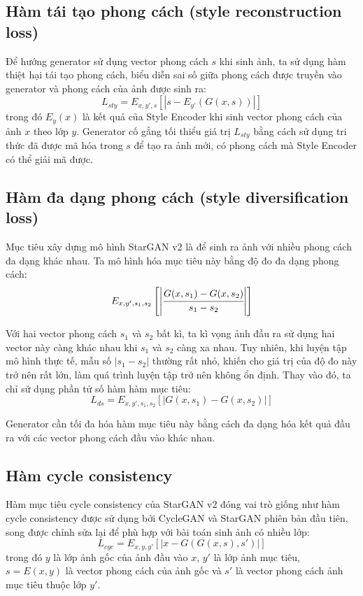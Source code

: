 \documentclass[12pt]{extreport}
\begin{document}
\subsection{Hàm tái tạo phong cách (style reconstruction loss)}

Để hướng generator sử dụng vector phong cách $ s $ khi sinh ảnh, ta sử dụng hàm thiệt hại tái tạo phong cách, biểu diễn sai số giữa phong cách được truyền vào generator và phong cách của ảnh được sinh ra:
$$ L_{sty} = E_{x,y',s} [|s - E_{y'}(G(x, s))|] $$
trong đó $ E_{y}(x) $ là kết quả của Style Encoder khi sinh vector phong cách của ảnh $ x $ theo lớp $ y $. Generator cố gắng tối thiểu giá trị $ L_{sty} $ bằng cách sử dụng tri thức đã được mã hóa trong $ s $ để tạo ra ảnh mới, có phong cách mà Style Encoder có thể giải mã được.

\subsection{Hàm đa dạng phong cách (style diversification loss)}

Mục tiêu xây dựng mô hình StarGAN v2 là để sinh ra ảnh với nhiều phong cách đa dạng khác nhau. Ta mô hình hóa mục tiêu này bằng độ đo đa dạng phong cách:
$$ E_{x,y',s_1,s_2} \left[\left|\cfrac{G(x,s_1) - G(x,s_2)}{s_1 - s_2}\right|\right] $$

Với hai vector phong cách $ s_1 $ và $ s_2 $ bất kì, ta kì vọng ảnh đầu ra sử dụng hai vector này càng khác nhau khi $ s_1 $ và $ s_2 $ càng xa nhau. Tuy nhiên, khi luyện tập mô hình thực tế, mẫu số $ | s_1 - s_2 | $ thường rất nhỏ, khiến cho giá trị của độ đo này trở nên rất lớn, làm quá trình luyện tập trở nên không ổn định. Thay vào đó, ta chỉ sử dụng phần tử số hàm hàm mục tiêu:
$$ L_{ds} = E_{x,y',s_1,s_2} \left[\left|G(x,s_1) - G(x,s_2)\right|\right] $$

Generator cần tối đa hóa hàm mục tiêu này bằng cách đa dạng hóa kết quả đầu ra với các vector phong cách đầu vào khác nhau.

\subsection{Hàm cycle consistency}

Hàm mục tiêu cycle consistency của StarGAN v2 đóng vai trò giống như hàm cycle consistency được sử dụng bởi CycleGAN và StarGAN phiên bản đầu tiên, song được chỉnh sửa lại để phù hợp với bài toán sinh ảnh có nhiều lớp:
$$ L_{cyc} = E_{x, y, y'} [|x - G(G(x, s), s')|] $$
trong đó $ y $ là lớp ảnh gốc của ảnh đầu vào $ x $, $ y' $ là lớp ảnh mục tiêu, $ s = E(x, y) $ là vector phong cách của ảnh gốc và $ s' $ là vector phong cách ảnh mục tiêu thuộc lớp $ y' $.
\end{document}
